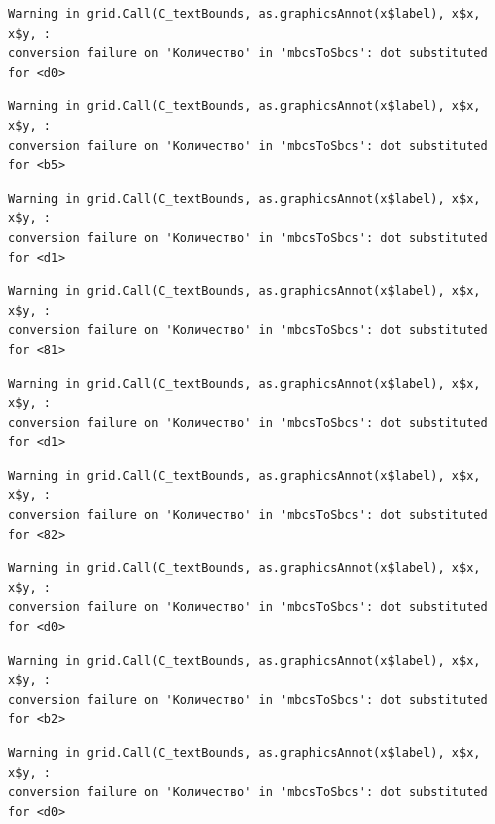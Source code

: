 \documentclass[
  letterpaper,
  DIV=11,
  numbers=noendperiod]{scrreprt}
\theoremstyle{definition}
\theoremstyle{remark}
\begin{document}
\begin{verbatim}
Warning in grid.Call(C_textBounds, as.graphicsAnnot(x$label), x$x, x$y, :
conversion failure on 'Количество' in 'mbcsToSbcs': dot substituted for <d0>
\end{verbatim}

\begin{verbatim}
Warning in grid.Call(C_textBounds, as.graphicsAnnot(x$label), x$x, x$y, :
conversion failure on 'Количество' in 'mbcsToSbcs': dot substituted for <b5>
\end{verbatim}

\begin{verbatim}
Warning in grid.Call(C_textBounds, as.graphicsAnnot(x$label), x$x, x$y, :
conversion failure on 'Количество' in 'mbcsToSbcs': dot substituted for <d1>
\end{verbatim}

\begin{verbatim}
Warning in grid.Call(C_textBounds, as.graphicsAnnot(x$label), x$x, x$y, :
conversion failure on 'Количество' in 'mbcsToSbcs': dot substituted for <81>
\end{verbatim}

\begin{verbatim}
Warning in grid.Call(C_textBounds, as.graphicsAnnot(x$label), x$x, x$y, :
conversion failure on 'Количество' in 'mbcsToSbcs': dot substituted for <d1>
\end{verbatim}

\begin{verbatim}
Warning in grid.Call(C_textBounds, as.graphicsAnnot(x$label), x$x, x$y, :
conversion failure on 'Количество' in 'mbcsToSbcs': dot substituted for <82>
\end{verbatim}

\begin{verbatim}
Warning in grid.Call(C_textBounds, as.graphicsAnnot(x$label), x$x, x$y, :
conversion failure on 'Количество' in 'mbcsToSbcs': dot substituted for <d0>
\end{verbatim}

\begin{verbatim}
Warning in grid.Call(C_textBounds, as.graphicsAnnot(x$label), x$x, x$y, :
conversion failure on 'Количество' in 'mbcsToSbcs': dot substituted for <b2>
\end{verbatim}

\begin{verbatim}
Warning in grid.Call(C_textBounds, as.graphicsAnnot(x$label), x$x, x$y, :
conversion failure on 'Количество' in 'mbcsToSbcs': dot substituted for <d0>
\end{verbatim}
\end{document}
